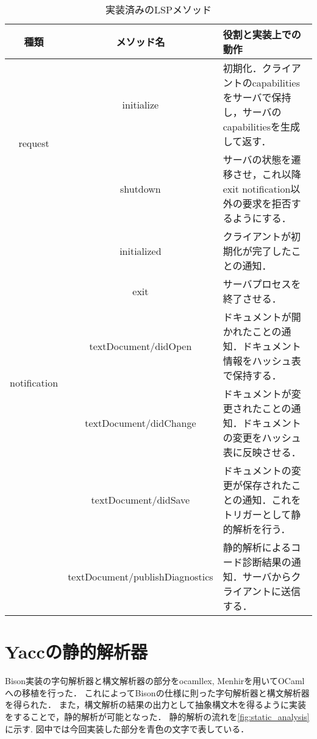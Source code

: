 \documentclass[fontsize=9bp,twocolumn,column_gap=2.36zw,a4paper,report]{jlreq}
\begin{document}
\begin{table*}[h]
	\caption{実装済みのLSPメソッド}\label{tbl:lsp_method}
	\small
	\centering
	\begin{tabularx}{\linewidth}{|c|c|X|}
		\hline
		種類 & メソッド名& 役割と実装上での動作 \\
		\hline\hline
		\multirow{2}{*}{request} & initialize & 初期化．クライアントのcapabilitiesをサーバで保持し，サーバのcapabilitiesを生成して返す． \\
		& shutdown & サーバの状態を遷移させ，これ以降exit notification以外の要求を拒否するようにする． \\
		\hline
		\multirow{5}{*}{notification} & initialized & クライアントが初期化が完了したことの通知． \\
		& exit & サーバプロセスを終了させる． \\
		& textDocument/didOpen & ドキュメントが開かれたことの通知．ドキュメント情報をハッシュ表で保持する． \\
		& textDocument/didChange & ドキュメントが変更されたことの通知．ドキュメントの変更をハッシュ表に反映させる． \\
		& textDocument/didSave & ドキュメントの変更が保存されたことの通知．これをトリガーとして静的解析を行う． \\
		& textDocument/publishDiagnostics & 静的解析によるコード診断結果の通知．サーバからクライアントに送信する． \\
		\hline
	\end{tabularx}
\end{table*}

\section{Yaccの静的解析器}\label{sec:analyzer}

Bison実装の字句解析器と構文解析器の部分をocamllex, Menhirを用いてOCamlへの移植を行った．
これによってBisonの仕様に則った字句解析器と構文解析器を得られた．
また，構文解析の結果の出力として抽象構文木を得るように実装をすることで，静的解析が可能となった．
静的解析の流れを\ref{fig:static_analysis}に示す.
図中では今回実装した部分を青色の文字で表している．

\begin{figure}[h]
\end{figure}

\begin{figure}[h]
\end{figure}
\end{document}
